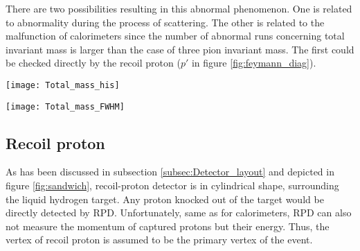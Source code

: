 There are two possibilities resulting in this abnormal phenomenon. One is related to abnormality during the process of scattering. The other is related to the malfunction of calorimeters since the number of abnormal runs concerning total invariant mass is larger than the case of three pion invariant mass. The first could be checked directly by the recoil proton ($p'$ in figure \ref{fig:feymann_diag}).

\begin{figure*}[!ht]
	\centering
	\vspace{2cm}
	\texttt{[image: Total\_mass\_his]}
	\caption{Histogram of invariant total mass distribution. The colors inside the histogram represent number of events corresponding to the run number and invariant mass. To better compare and conceive the structure of distribution between runs visually, the maximal value of each distribution is normalized to 1000. In the red dashed rectangles, it can be seen that the red strokes are much longer than the normal runs.}
	\label{fig:Total_mass_his}
	\vspace{2 cm}
	
	\texttt{[image: Total\_mass\_FWHM]}
	\caption{Value of full width at half maximum of total invariant distribution for each run. Typical value of FWHM for normal run is around \SI{1.5}{\giga\electronvolt}.There are several outliners that have much bigger FWHM value than the general one. Also there is a range of runs 70223 $\sim$ 70240 that have slight smaller value of FWHM. }
	\label{fig:Total_mass_FWHM}
	\vspace{2cm}
\end{figure*}

\subsection{Recoil proton}
As has been discussed in subsection \ref{subsec:Detector_layout} and depicted in figure \ref{fig:sandwich}, recoil-proton detector is in cylindrical shape, surrounding the liquid hydrogen target. Any proton knocked out of the target would be directly detected by RPD. Unfortunately, same as for calorimeters, RPD can also not measure the momentum of captured protons but their energy. Thus, the vertex of recoil proton is assumed to be the primary vertex of the event.
\clearpage

